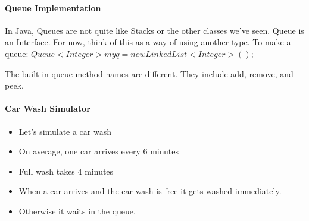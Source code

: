 \documentclass[10pt,a4paper]{article}
\begin{document}
\paragraph{Queue Implementation}
In Java, Queues are not quite like Stacks or the other classes we've seen. Queue is an Interface. For now, think of this as a way of using another type. To make a queue: $Queue<Integer> myq = new LinkedList<Integer>();$

The built in queue method names are different. They include add, remove, and peek.

\paragraph{Car Wash Simulator}
\begin{itemize}
\item Let's simulate a car wash
\item On average, one car arrives every 6 minutes
\item Full wash takes 4 minutes
\item When a car arrives and the car wash is free it gets washed immediately.
\item Otherwise it waits in the queue.
\end{itemize}
\end{document}
